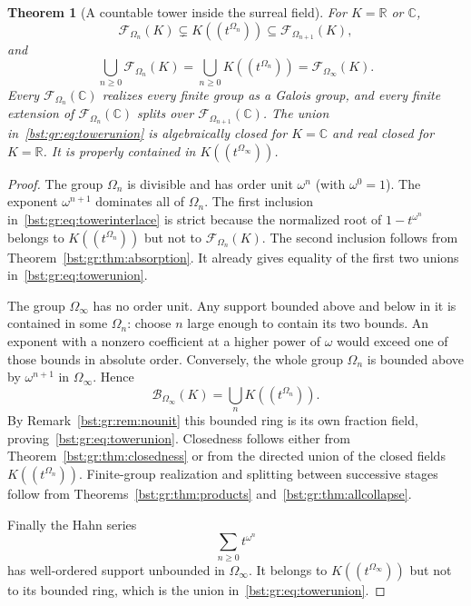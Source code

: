\documentclass[11pt,letterpaper]{article}
\newtheorem{theorem}{Theorem}[section]
\theoremstyle{definition}
\theoremstyle{remark}
\newcommand{\R}{\mathbb R}
\newcommand{\C}{\mathbb C}
\newcommand{\HH}[2]{#1((t^{#2}))}
\newcommand{\BB}[2]{\mathcal B_{#2}(#1)}
\newcommand{\FF}[2]{\mathcal F_{#2}(#1)}
\begin{document}
\begin{theorem}[A countable tower inside the surreal field]\label{bst:gr:thm:tower}
For $K=\R$ or $\C$,
\begin{equation}\label{bst:gr:eq:towerinterlace}
 \FF K{\Omega_n}\subsetneq\HH K{\Omega_n}\subseteq\FF K{\Omega_{n+1}},
\end{equation}
and
\begin{equation}\label{bst:gr:eq:towerunion}
 \bigcup_{n\geq0}\FF K{\Omega_n}=\bigcup_{n\geq0}\HH K{\Omega_n}=\FF K{\Omega_\infty}.
\end{equation}
Every $\FF{\C}{\Omega_n}$ realizes every finite group as a Galois group, and
every finite extension of $\FF{\C}{\Omega_n}$ splits over
$\FF{\C}{\Omega_{n+1}}$. The union in~\eqref{bst:gr:eq:towerunion} is
algebraically closed for $K=\C$ and real closed for $K=\R$. It is properly
contained in $\HH K{\Omega_\infty}$.
\end{theorem}
\begin{proof}
The group $\Omega_n$ is divisible and has order unit $\omega^n$ (with
$\omega^0=1$). The exponent $\omega^{n+1}$ dominates all of $\Omega_n$. The
first inclusion in~\eqref{bst:gr:eq:towerinterlace} is strict because the
normalized root of $1-t^{\omega^n}$ belongs to $\HH K{\Omega_n}$ but not to
$\FF K{\Omega_n}$. The second inclusion follows from
Theorem~\ref{bst:gr:thm:absorption}. It already gives equality of the first
two unions in~\eqref{bst:gr:eq:towerunion}.

The group $\Omega_\infty$ has no order unit. Any support bounded above and
below in it is contained in some $\Omega_n$: choose $n$ large enough to
contain its two bounds. An exponent with a nonzero coefficient at a higher
power of $\omega$ would exceed one of those bounds in absolute order.
Conversely, the whole group $\Omega_n$ is bounded above by $\omega^{n+1}$ in
$\Omega_\infty$. Hence
\[
 \BB K{\Omega_\infty}=\bigcup_n\HH K{\Omega_n}.
\]
By Remark~\ref{bst:gr:rem:nounit} this bounded ring is its own fraction field,
proving~\eqref{bst:gr:eq:towerunion}. Closedness follows either from
Theorem~\ref{bst:gr:thm:closedness} or from the directed union of the closed
fields $\HH K{\Omega_n}$. Finite-group realization and splitting between
successive stages follow from Theorems~\ref{bst:gr:thm:products}
and~\ref{bst:gr:thm:allcollapse}.

Finally the Hahn series
\[
 \sum_{n\geq0}t^{\omega^n}
\]
has well-ordered support unbounded in $\Omega_\infty$. It belongs to
$\HH K{\Omega_\infty}$ but not to its bounded ring, which is the union
in~\eqref{bst:gr:eq:towerunion}.
\end{proof}
\end{document}

